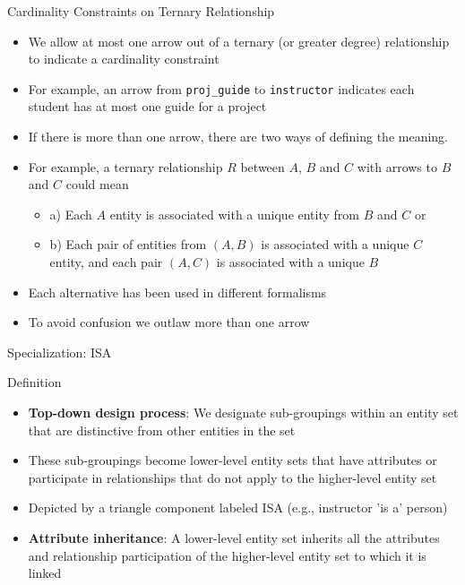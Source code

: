 \documentclass[aspectratio=169, xcolor=dvipsnames]{beamer}
\begin{document}
\begin{frame}{Cardinality Constraints on Ternary Relationship}
    \begin{itemize}[<+->]
        \item We allow at most one arrow out of a ternary (or greater degree) relationship to indicate a cardinality constraint
        \item For example, an arrow from \texttt{proj\_guide} to \texttt{instructor} indicates each student has at most one guide for a project
        \item If there is more than one arrow, there are two ways of defining the meaning.
        \item For example, a ternary relationship $R$ between $A$, $B$ and $C$ with arrows to $B$ and $C$ could mean
        \begin{itemize}
            \item[$\triangleright$] a) Each $A$ entity is associated with a unique entity from $B$ and $C$ or
            \item[$\triangleright$] b) Each pair of entities from $(A, B)$ is associated with a unique $C$ entity, and each pair $(A, C)$ is associated with a unique $B$
        \end{itemize}
        \item Each alternative has been used in different formalisms
        \item To avoid confusion we outlaw more than one arrow
    \end{itemize}
\end{frame}

\begin{frame}{Specialization: ISA}
    \begin{block}{Definition}
        \begin{itemize}[<+->]
            \item \textbf{Top-down design process}: We designate sub-groupings within an entity set that are distinctive from other entities in the set
            \item These sub-groupings become lower-level entity sets that have attributes or participate in relationships that do not apply to the higher-level entity set
            \item Depicted by a triangle component labeled ISA (e.g., instructor 'is a' person)
            \item \textbf{Attribute inheritance}: A lower-level entity set inherits all the attributes and relationship participation of the higher-level entity set to which it is linked
        \end{itemize}
    \end{block}
\end{frame}
\end{document}
